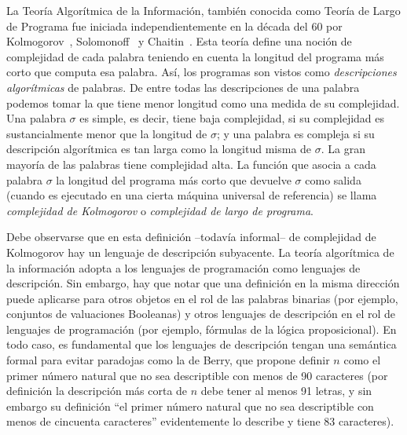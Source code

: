 La Teoría Algorítmica de la Información, también
conocida como Teoría de Largo de Programa fue iniciada
independientemente en la década del 60 por Kolmogorov~\cite{kolmogorov1965three},
Solomonoff~\cite{solomonoff1964formal} y Chaitin~\cite{chaitin1969length}. 
Esta teoría define una
noción de complejidad de cada palabra teniendo en cuenta la longitud
del programa más corto que computa esa palabra. Así, los programas
son vistos como {\em descripciones algorítmicas} de palabras. De
entre todas las descripciones de una palabra podemos tomar la que
tiene menor longitud como una medida de su complejidad. Una palabra
$\sigma$ es simple, es decir, tiene baja complejidad, si su
complejidad es sustancialmente menor que la longitud de $\sigma$; y
una palabra es compleja si su descripción algorítmica es tan larga
como la longitud misma de $\sigma$. La gran mayoría
de las palabras tiene complejidad alta. La función que asocia a cada
palabra $\sigma$ la longitud del programa más corto que devuelve
$\sigma$ como salida (cuando es ejecutado en una cierta máquina
universal de referencia) se llama {\em complejidad de Kolmogorov} o
{\em complejidad de largo de programa}.

Debe
observarse que en esta definición --todavía informal-- 
de complejidad de Kolmogorov hay
un lenguaje de descripción subyacente. La teoría algorítmica de la información
adopta a los lenguajes de programación como lenguajes de descripción. Sin embargo, 
hay que notar que una definición en la misma dirección puede aplicarse para 
otros objetos en el rol de las palabras binarias (por ejemplo, conjuntos de valuaciones 
Booleanas) y otros lenguajes de descripción en el rol de lenguajes de programación
(por ejemplo, fórmulas de la lógica proposicional). En todo caso, es fundamental
que los lenguajes de descripción tengan una semántica formal para evitar paradojas
como la de Berry, que propone definir $n$ como el primer número natural que no sea 
descriptible con menos de 90 caracteres (por definición la descripción más corta de $n$ debe tener al menos 91 letras, y sin embargo su definición ``el primer número natural que no sea descriptible con menos de cincuenta caracteres'' evidentemente lo describe y tiene 83 caracteres).

